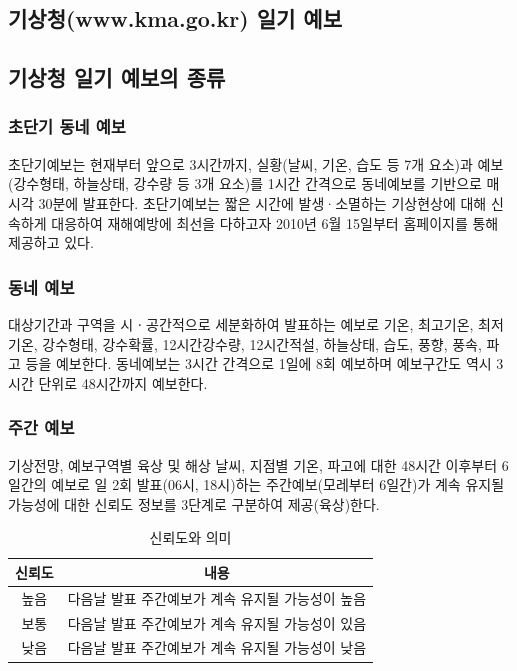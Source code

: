 \begin{corollary}[Corollary name]


\chapter{기상청(www.kma.go.kr) 일기 예보}

\section{기상청 일기 예보의 종류}


\subsection{초단기 동네 예보}
초단기예보는 현재부터 앞으로 3시간까지, 실황(날씨, 기온, 습도 등 7개 요소)과 예보(강수형태, 하늘상태, 강수량 등 3개 요소)를 1시간 간격으로 동네예보를 기반으로 매 시각 30분에 발표한다. 초단기예보는 짧은 시간에 발생·소멸하는 기상현상에 대해 신속하게 대응하여 재해예방에 최선을 다하고자 2010년 6월 15일부터 홈페이지를 통해 제공하고 있다.

\subsection{동네 예보}
대상기간과 구역을 시ㆍ공간적으로 세분화하여 발표하는 예보로 기온, 최고기온, 최저기온, 강수형태, 강수확률, 12시간강수량, 12시간적설, 하늘상태, 습도, 풍향, 풍속, 파고 등을 예보한다. 동네예보는 3시간 간격으로 1일에 8회 예보하며 예보구간도 역시 3시간 단위로 48시간까지 예보한다. 

\subsection{주간 예보}
기상전망, 예보구역별 육상 및 해상 날씨, 지점별 기온, 파고에 대한 48시간 이후부터  6일간의 예보로 일 2회 발표(06시, 18시)하는 주간예보(모레부터 6일간)가 계속 유지될 가능성에 대한 신뢰도 정보를 3단계로 구분하여 제공(육상)한다.

\begin{table}[h]
	\centering
	\caption{신뢰도와 의미}
	\begin{tabular*}{.8\linewidth}{c|c}
		\hline 
		신뢰도  &	내용	  \\ 	\hline 
		높음  & 다음날 발표 주간예보가 계속 유지될 가능성이 높음  \\  \hline 
		보통 & 다음날 발표 주간예보가 계속 유지될 가능성이 있음  \\ 	\hline 
		낮음 & 다음날 발표 주간예보가 계속 유지될 가능성이 낮음   \\ 	\hline 
	\end{tabular*} 
\end{table}


\end{corollary}
